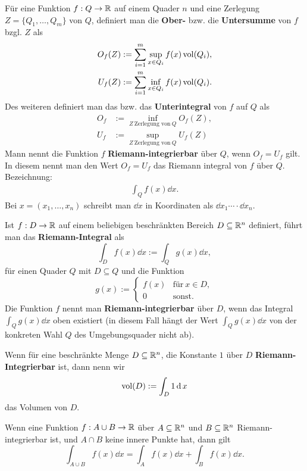 \begin{defn} 
	Für eine Funktion $f : Q \to \mathbb{R}$ auf einem Quader $n$ und eine Zerlegung $Z= \{Q_1,\ldots,Q_m\}$ von $Q$, definiert man die \textbf{Ober-} bzw. die \textbf{Untersumme} von $f$ bzgl. $Z$ als 
	\begin{align*}
		O_f(Z) & := \sum_{i=1}^m \sup_{x \in Q_i} f(x) \operatorname{vol}(Q_i), 
\\		U_f(Z) & := \sum_{i=1}^m \inf_{x \in Q_i} f(x) \operatorname{vol}(Q_i).
	\end{align*} 
	Des weiteren definiert man das  bzw. das \textbf{Unterintegral} von $f$ auf $Q$ als 
	\begin{align*}
		O_f & := \inf_{Z \ \text{Zerlegung von} \  Q} O_f(Z),
		\\ U_f & := \sup_{Z \ \text{Zerlegung von} \ Q}	U_f(Z)
	\end{align*}
	Mann nennt die Funktion $f$ \textbf{Riemann-integrierbar} über $Q$, wenn $O_f=U_f$ gilt. In diesem nennt man den Wert $O_f = U_f$ das Riemann integral von $f$ über $Q$. Bezeichnung: 
	\begin{align*}
		\int_Q f(x) \dd x. 
	\end{align*} 
	Bei $x = (x_1,\ldots,x_n)$ schreibt man $\dd x$ in Koordinaten als $\dd x_1 \cdots \cdot \dd x_n$.  
\end{defn} 

\begin{defn} 
	Ist $ f: D \to \mathbb{R}$ auf einem beliebigen beschränkten Bereich $D \subseteq \mathbb{R}^n$ definiert, führt man das \textbf{Riemann-Integral} als 
	\[
		\int_D f (x) \dd x := \int_Q g(x) \dd x, 
	\]
	für einen Quader $Q$ mit $D \subseteq Q$ und die Funktion 
	\[
		g(x) := \begin{cases} f(x) & \text{für} \ x \in D,
			\\ 0 & \text{sonst}. 
		\end{cases}
	\]
	Die Funktion $f$ nennt man \textbf{Riemann-integrierbar} über $D$, wenn das Integral $\int_Q g(x) \dd x$ oben existiert (in diesem Fall hängt der Wert $\int_Q g(x) \dd x$ von der konkreten Wahl $Q$ des Umgebungsquader nicht ab). 
\end{defn} 

\begin{defn}
	Wenn für eine beschränkte Menge $D \subseteq \mathbb{R}^n$, die Konstante $1$ über $D$ \textbf{Riemann-Integrierbar} ist, dann nenn wir
	\[
		\operatorname{vol}(D) := \int_D 1 \operatorname{d} x
	\]
	das Volumen von $D$. 
\end{defn} 

\begin{thm}
	Wenn eine Funktion $f : A\cup B \to \mathbb{R}$ über $A \subseteq \mathbb{R}^n$ und $B \subseteq \mathbb{R}^n$ Riemann-integrierbar ist, und $A\cap B$ keine innere Punkte hat, dann gilt 
	\[
		\int_{A \cup B}  f(x) \dd x = \int_A f(x) \dd x  + \int_B f(x) \dd x.
	\]
\end{thm} 


